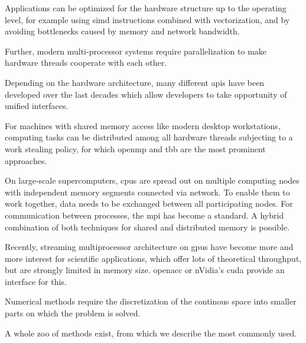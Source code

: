 
Applications can be optimized for the hardware structure up to the operating level, for example using \gls{simd} instructions combined with vectorization, and by avoiding bottlenecks caused by memory and network bandwidth.

Further, modern multi-processor systems require parallelization to make hardware threads cooperate with each other.%

Depending on the hardware architecture, many different \glspl{api} have been developed over the last decades which allow developers to take opportunity of unified interfaces.

For machines with shared memory access like modern desktop workstations, computing tasks can be distributed among all hardware threads subjecting to a work stealing policy, for which \gls{openmp} \textcite{openmp50} and \gls{tbb} \textcite{tbb2018} are the most prominent approaches.

On large-scale supercomputers, \glspl{cpu} are spread out on multiple computing nodes with independent memory segments connected via network. To enable them to work together, data needs to be exchanged between all participating nodes. For communication between processes, the \gls{mpi} \textcite{mpi31} has become a standard. A hybrid combination of both techniques for shared and distributed memory is possible.


Recently, streaming multiprocessor architecture on \glspl{gpu} have become more and more interest for scientific applications, which offer lots of theoretical throughput, but are strongly limited in memory size. \gls{openacc} \textcite{openacc27} or nVidia's \gls{cuda} \textcite{cuda10} provide an interface for this.


Numerical methods require the discretization of the continous space into smaller parts on which the problem is solved.

A whole zoo of methods exist, from which we describe the most commonly used.

